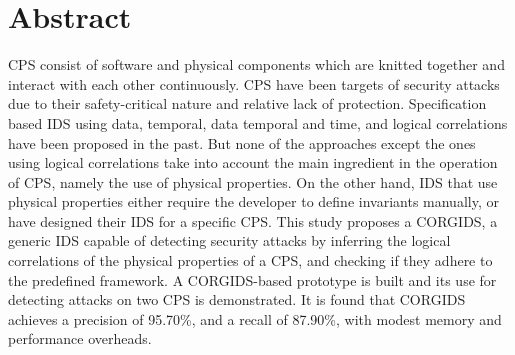 
\chapter{Abstract}

 \ac{CPS} consist of software and physical components which are knitted together and interact with each other continuously. \ac{CPS} have been targets of security attacks due to their safety-critical nature and relative lack of protection. Specification based \ac{IDS} using data, temporal, data temporal and time, and logical correlations have been proposed in the past. But none of the approaches except the ones using logical correlations take into account the main ingredient in the operation of \ac{CPS}, namely the use of physical properties. On the other hand, \ac{IDS} that use physical properties either require the developer to define invariants manually, or have designed their \ac{IDS} for a specific \ac{CPS}. This study proposes a \ac{CORGIDS}, a generic \ac{IDS} capable of detecting security attacks by inferring the logical correlations of the physical properties of a \ac{CPS}, and checking if they adhere to the predefined framework. A \ac{CORGIDS}-based prototype is built and its use for detecting attacks on two \ac{CPS} is demonstrated. It is found that \ac{CORGIDS} achieves a precision of  95.70\%, and a recall of 87.90\%, with modest memory and performance overheads.

